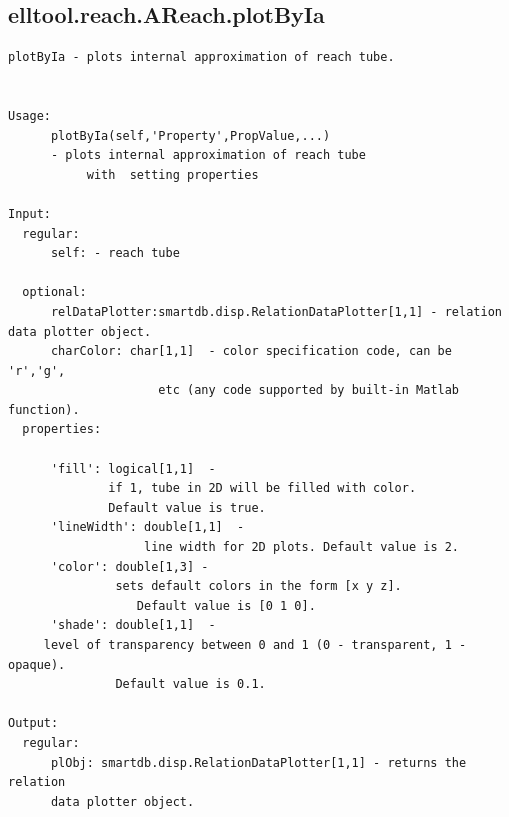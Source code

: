 \subsection{\texorpdfstring{elltool.reach.AReach.plotByIa}{plotByIa}}\label{method:elltool.reach.AReach.plotByIa}
\begin{verbatim}
plotByIa - plots internal approximation of reach tube.


Usage:
      plotByIa(self,'Property',PropValue,...)
      - plots internal approximation of reach tube
           with  setting properties

Input:
  regular:
      self: - reach tube

  optional:
      relDataPlotter:smartdb.disp.RelationDataPlotter[1,1] - relation data plotter object.
      charColor: char[1,1]  - color specification code, can be 'r','g',
                     etc (any code supported by built-in Matlab function).
  properties:

      'fill': logical[1,1]  -
              if 1, tube in 2D will be filled with color.
              Default value is true.
      'lineWidth': double[1,1]  -
                   line width for 2D plots. Default value is 2.
      'color': double[1,3] -
               sets default colors in the form [x y z].
                  Default value is [0 1 0].
      'shade': double[1,1]  -
     level of transparency between 0 and 1 (0 - transparent, 1 - opaque).
               Default value is 0.1.

Output:
  regular:
      plObj: smartdb.disp.RelationDataPlotter[1,1] - returns the relation
      data plotter object.
\end{verbatim}
